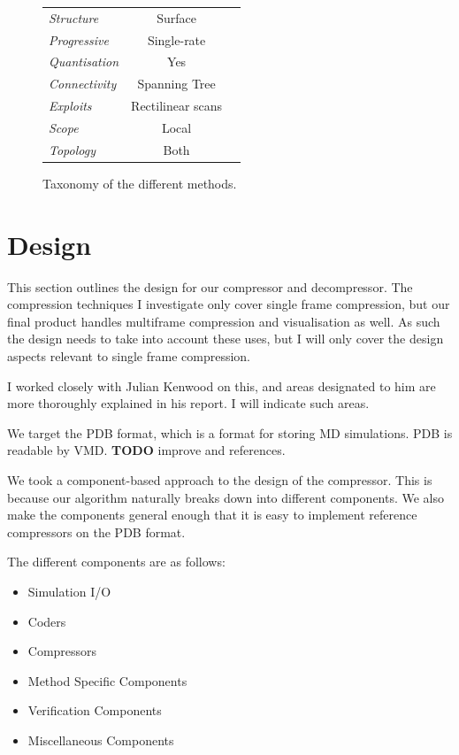 \documentclass{report}
\begin{document}
\begin{figure}
{\begin{tabular}{||l|c|c||}
  \hline

  \emph{Structure} & Surface & \\

  \emph{Progressive} & Single-rate & \\  

  \emph{Quantisation} & Yes & \\

  \emph{Connectivity} & Spanning Tree & \\

  \emph{Exploits} & Rectilinear scans & \\

  \emph{Scope} & Local & \\

  \emph{Topology} & Both & \\

  \hline
\end{tabular}
}
\caption{Taxonomy of the different methods.}\label{fig:taxonomy}
\end{figure}


\chapter{Design}

This section outlines the design for our compressor and decompressor. The
compression techniques I investigate only cover single frame compression, but
our final product handles multiframe compression and visualisation as well. As
such the design needs to take into account these uses, but I will only cover
the design aspects relevant to single frame compression.

I worked closely with Julian Kenwood on this, and areas designated to him are
more thoroughly explained in his report. I will indicate such areas.

We target the PDB format, which is a format for storing MD simulations. PDB is
readable by VMD. \textbf{TODO} improve and references.

We took a component-based approach to the design of the compressor. This is
because our algorithm naturally breaks down into different components. We also
make the components general enough that it is easy to implement reference
compressors on the PDB format.

The different components are as follows:
\begin{itemize}
\item Simulation I/O
\item Coders
\item Compressors
\item Method Specific Components
\item Verification Components
\item Miscellaneous Components
\end{itemize}
\end{document}
